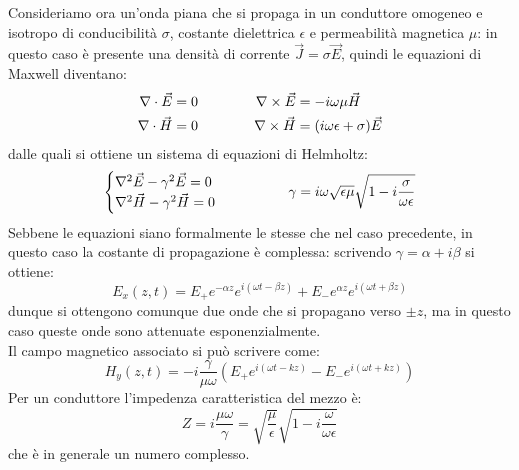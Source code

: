 Consideriamo ora un'onda piana che si propaga in un conduttore omogeneo e isotropo di conducibilità $ \sigma $, costante dielettrica $ \epsilon $ e permeabilità magnetica $ \mu $: in questo caso è presente una densità di corrente $ \vec{J} = \sigma\vec{E} $, quindi le equazioni di Maxwell diventano:
\begin{equation}
	\begin{split}
		\nabla\cdot\vec{E} &= 0 \\ 
		\nabla\cdot\vec{H} &= 0 
	\end{split}
	\qquad\qquad
	\begin{split}
		\nabla\times\vec{E} &= - i\omega \mu \vec{H} \\ 
		\nabla\times\vec{H} &= (i\omega \epsilon + \sigma) \vec{E}
	\end{split}
	\label{eq:18}
\end{equation}
dalle quali si ottiene un sistema di equazioni di Helmholtz:
\begin{equation}
	\begin{cases}
		\nabla^2\vec{E} - \gamma^2 \vec{E} = 0 \\ 
		\nabla^2\vec{H} - \gamma^2 \vec{H} = 0 
	\end{cases}
	\qquad\qquad \gamma = i \omega \sqrt{\epsilon\mu} \sqrt{1 - i \frac{\sigma}{\omega\epsilon}}
	\label{eq:19}
\end{equation}
Sebbene le equazioni siano formalmente le stesse che nel caso precedente, in questo caso la costante di propagazione è complessa: scrivendo $ \gamma = \alpha + i\beta $ si ottiene:
\begin{equation}
	E_x (z,t) = E_+ e^{-\alpha z} e^{i(\omega t - \beta z)} + E_- e^{\alpha z} e^{i(\omega t + \beta z)}
	\label{eq:20}
\end{equation}
dunque si ottengono comunque due onde che si propagano verso $ \pm z $, ma in questo caso queste onde sono attenuate esponenzialmente. \\ 
%
Il campo magnetico associato si può scrivere come:
\begin{equation}
	H_y (z,t) = -i\frac{\gamma}{\mu \omega} \left(E_+ e^{i(\omega t - kz)} - E_- e^{i(\omega t + kz)}\right)
	\label{eq:21}
\end{equation}
%
Per un conduttore l'impedenza caratteristica del mezzo è:
\begin{equation}
	Z = i \frac{\mu \omega}{\gamma} = \sqrt{\frac{\mu}{\epsilon}} \sqrt{1 - i \frac{\omega}{\omega \epsilon}}
	\label{eq:22}
\end{equation}
che è in generale un numero complesso. \\ 
